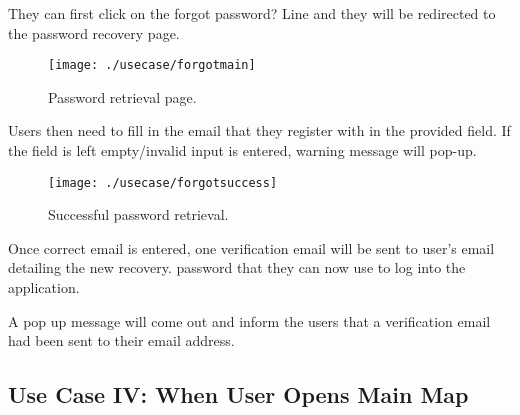 \documentclass[conference]{IEEEtran}
\begin{document}
\par They can first click on the forgot password? Line and they will be redirected to the password recovery page.
\begin{figure}[h!]
\texttt{[image: ./usecase/forgotmain]}
\centering
\caption{Password retrieval page.}
\end{figure}
\par Users then need to fill in the email that they register with in the provided field. If the field is left empty/invalid input is entered, warning message will pop-up.
\begin{figure}[h!]
\texttt{[image: ./usecase/forgotsuccess]}
\centering
\caption{Successful password retrieval.}
\end{figure}
\par Once correct email is entered, one verification email will be sent to user’s email detailing the new recovery. 
password that they can now use to log into the application.

\par A pop up message will come out and inform the users that a verification email had been sent to their email address.

\subsection{Use Case IV: When User Opens Main Map}
\end{document}
